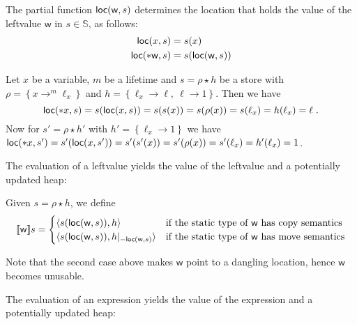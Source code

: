\begin{definition}[Locate]
  The partial function $\loc(\mathsf{w},s)$ determines the location that holds
  the value of the leftvalue $\mathsf{w}$ in $s\in\mathbb{S}$, as follows:
  \begin{align*}
    \loc(x,s) &= s(x)\\
    \loc(*\mathsf{w},s) &= s(\loc(\mathsf{w},s))
  \end{align*}
\end{definition}

\begin{example}
  Let $x$ be a variable, $m$ be a lifetime and
  $s = \rho\star h$ be a store with
  $\rho = \left\{x\rightarrow^m\ell_x\right\}$
  and $h = \left\{\ell_x\rightarrow\ell,\ \ell\rightarrow 1\right\}$.
  Then we have
  \[\loc(\mathtt{*}x,s) = s(\loc(x,s)) = s(s(x)) = s(\rho(x))
  = s(\ell_x) = h(\ell_x) = \ell\;.\]
  Now for $s' = \rho\star h'$ with
  $h' = \left\{\ell_x\rightarrow 1\right\}$ we have
  $\loc(\mathtt{*}x,s') = s'(\loc(x,s')) = s'(s'(x)) = s'(\rho(x))
  = s'(\ell_x) = h'(\ell_x) = 1$.
\end{example}


The evaluation of a leftvalue yields the value of the leftvalue and a potentially updated heap:

\begin{definition}\label{def:semantics_leftvalues}
  Given $s=\rho\star h$, we define
  \[
  \den[\mathsf{w}]{s}=\begin{cases}
  \langle s(\loc(\mathsf{w},s)), h\rangle & \text{if the static type of $\mathsf{w}$ has copy semantics}\\
  \langle s(\loc(\mathsf{w},s)), h|_{-\loc(\mathsf{w},s)}\rangle & \text{if the static type of $\mathsf{w}$ has move semantics}
  \end{cases}
  \]
\end{definition}

\noindent
Note that the second case above makes $\mathsf{w}$ point to a dangling location, hence
$\mathsf{w}$ becomes unusable.

The evaluation of an expression yields the value of the expression and a potentially updated heap:

